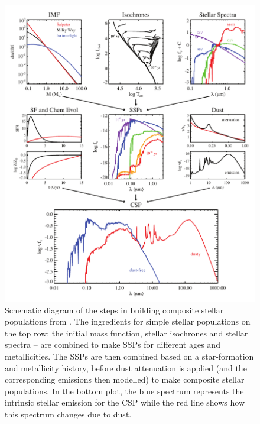 \begin{figure}
\centering
	  \includegraphics[width=1\textwidth]{sed_plot.pdf}
	  \caption[Schematic diagram of the steps in building composite stellar populations from \citet{Conroy:2013dk}.]{Schematic diagram of the steps in building composite stellar populations from \citet{Conroy:2013dk}. The ingredients for simple stellar populations on the top row; the initial mass function, stellar isochrones and stellar spectra -- are combined to make SSPs for different ages and metallicities. The SSPs are then combined based on a star-formation and metallicity history, before dust attenuation is applied (and the corresponding emissions then modelled) to make composite stellar populations. In the bottom plot, the blue spectrum represents the intrinsic stellar emission for the CSP while the red line shows how this spectrum changes due to dust.}
	  \label{fig:sed_plot}
\end{figure}

